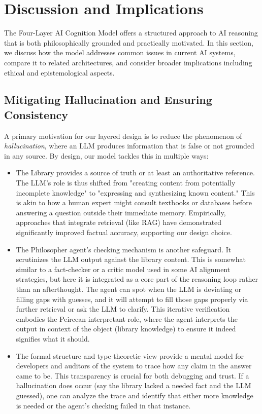 \documentclass{article}
\begin{document}
\hrulefill




\section{Discussion and Implications}\label{sec:discussion}
The Four-Layer AI Cognition Model offers a structured approach to AI reasoning that is both philosophically grounded and practically motivated. In this section, we discuss how the model addresses common issues in current AI systems, compare it to related architectures, and consider broader implications including ethical and epistemological aspects.

\subsection{Mitigating Hallucination and Ensuring Consistency}
A primary motivation for our layered design is to reduce the phenomenon of \emph{hallucination}, where an LLM produces information that is false or not grounded in any source. By design, our model tackles this in multiple ways:
\begin{itemize}
    \item The Library provides a source of truth or at least an authoritative reference. The LLM's role is thus shifted from "creating content from potentially incomplete knowledge" to "expressing and synthesizing known content." This is akin to how a human expert might consult textbooks or databases before answering a question outside their immediate memory. Empirically, approaches that integrate retrieval (like RAG) have demonstrated significantly improved factual accuracy, supporting our design choice.
    \item The Philosopher agent's checking mechanism is another safeguard. It scrutinizes the LLM output against the library content. This is somewhat similar to a fact-checker or a critic model used in some AI alignment strategies, but here it is integrated as a core part of the reasoning loop rather than an afterthought. The agent can spot when the LLM is deviating or filling gaps with guesses, and it will attempt to fill those gaps properly via further retrieval or ask the LLM to clarify. This iterative verification embodies the Peircean interpretant role, where the agent interprets the output in context of the object (library knowledge) to ensure it indeed signifies what it should.
    \item The formal structure and type-theoretic view provide a mental model for developers and auditors of the system to trace how any claim in the answer came to be. This transparency is crucial for both debugging and trust. If a hallucination does occur (say the library lacked a needed fact and the LLM guessed), one can analyze the trace and identify that either more knowledge is needed or the agent's checking failed in that instance.
\end{itemize}
\end{document}
